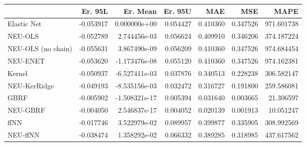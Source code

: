\begin{tabular}{lrrrrrr}
\toprule
{} &   Er. 95L &      Er. Mean &   Er. 95U &       MAE &       MSE &        MAPE \\
\midrule
Elastic Net        & -0.053917 &  0.000000e+00 &  0.054427 &  0.410360 &  0.347526 &  971.601738 \\
NEU-OLS            & -0.052789 &  2.744456e-03 &  0.056624 &  0.409910 &  0.346206 &  374.187224 \\
NEU-OLS (no chain) & -0.055631 &  3.867490e-09 &  0.056209 &  0.410360 &  0.347526 &  974.684454 \\
NEU-ENET           & -0.053620 & -1.173476e-08 &  0.055120 &  0.410360 &  0.347526 &  974.162381 \\
Kernel             & -0.050937 & -6.527411e-03 &  0.037876 &  0.340513 &  0.228238 &  306.582147 \\
NEU-KerRidge       & -0.049193 & -8.535156e-03 &  0.032472 &  0.316727 &  0.191800 &  259.586081 \\
GBRF               & -0.005902 & -1.508321e-17 &  0.005394 &  0.031640 &  0.003665 &   21.306597 \\
NEU-GBRF           & -0.004050 &  2.546837e-17 &  0.004052 &  0.020139 &  0.001913 &   10.051247 \\
ffNN               & -0.017746 &  3.522979e-02 &  0.089957 &  0.399877 &  0.335905 &  308.992569 \\
NEU-ffNN           & -0.038474 &  1.358292e-02 &  0.066332 &  0.389285 &  0.318985 &  437.617562 \\
\bottomrule
\end{tabular}
